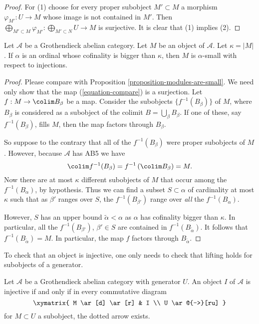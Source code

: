 \begin{proof}
For (1) choose for every proper subobject $M' \subset M$ a morphism
$\varphi_{M'} : U \to M$ whose image is not contained in $M'$. Then
$\bigoplus_{M' \subset M} \varphi_{M'} : \bigoplus_{M' \subset N} U \to M$
is surjective. It is clear that (1) implies (2).
\end{proof}

\begin{proposition}
\label{proposition-objects-are-small}
Let $\mathcal{A}$ be a Grothendieck abelian category. Let $M$ be an
object of $\mathcal{A}$. Let $\kappa = |M|$.
If $\alpha$ is an ordinal whose cofinality is bigger than $\kappa$,
then $M$ is $\alpha$-small with respect to injections.
\end{proposition}

\begin{proof}
Please compare with Proposition \ref{proposition-modules-are-small}.
We need only show that the map (\ref{equation-compare}) is a surjection.
Let $f : M \to \colim B_\beta$ be a map.
Consider the subobjects $\{f^{-1}(B_\beta)\}$ of $M$, where $B_\beta$
is considered as a subobject of the colimit $B = \bigcup_\beta B_\beta$.
If one of these, say $f^{-1}(B_\beta)$, fills $M$,
then the map factors through $B_\beta$.

\medskip\noindent
So suppose to the contrary that all of the $f^{-1}(B_\beta)$ were proper
subobjects of $M$. However, because $\mathcal{A}$ has
AB5 we have
$$
\colim f^{-1}(B_\beta) = f^{-1}\left(\colim B_\beta\right) = M.
$$
Now there are at most $\kappa$ different subobjects of $M$ that occur among
the $f^{-1}(B_\alpha)$, by hypothesis.
Thus we can find a subset $S \subset \alpha$ of cardinality at most
$\kappa$ such that as $\beta'$ ranges over $S$, the
$f^{-1}(B_{\beta'})$ range over \emph{all} the $f^{-1}(B_\alpha)$.

\medskip\noindent
However, $S$ has an upper bound $\widetilde{\alpha} < \alpha$ as
$\alpha$ has cofinality bigger than $\kappa$. In particular, all the
$f^{-1}(B_{\beta'})$, $\beta' \in S$ are contained in
$f^{-1}(B_{\widetilde{\alpha}})$.
It follows that $f^{-1}(B_{\widetilde{\alpha}}) = M$.
In particular, the map $f$ factors through $B_{\widetilde{\alpha}}$.
\end{proof}

\begin{lemma}
\label{lemma-characterize-injective}
\begin{slogan}
To check that an object is injective, one only needs to check that lifting
holds for subobjects of a generator.
\end{slogan}
Let $\mathcal{A}$ be a Grothendieck abelian category with generator $U$.
An object $I$ of $\mathcal{A}$ is injective if and only if in every
commutative diagram
$$
\xymatrix{
M \ar[d] \ar[r] &  I \\
U \ar@{-->}[ru]
}
$$
for $M \subset U$ a subobject, the dotted arrow exists.
\end{lemma}

